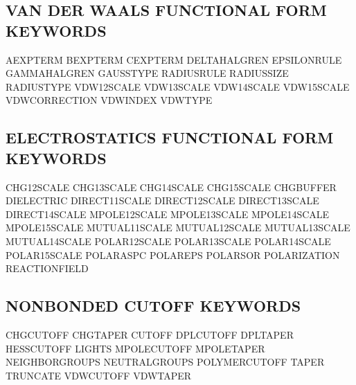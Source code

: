 \documentclass[letterpaper,11pt,english]{sphinxmanual}
\begin{document}
\subsection{VAN DER WAALS FUNCTIONAL FORM KEYWORDS}
\label{\detokenize{text/keywords:van-der-waals-functional-form-keywords}}
A\sphinxhyphen{}EXPTERM       B\sphinxhyphen{}EXPTERM       C\sphinxhyphen{}EXPTERM
DELTA\sphinxhyphen{}HALGREN   EPSILONRULE     GAMMA\sphinxhyphen{}HALGREN
GAUSSTYPE       RADIUSRULE      RADIUSSIZE
RADIUSTYPE      VDW\sphinxhyphen{}12\sphinxhyphen{}SCALE    VDW\sphinxhyphen{}13\sphinxhyphen{}SCALE
VDW\sphinxhyphen{}14\sphinxhyphen{}SCALE    VDW\sphinxhyphen{}15\sphinxhyphen{}SCALE    VDW\sphinxhyphen{}CORRECTION
VDWINDEX        VDWTYPE


\subsection{ELECTROSTATICS FUNCTIONAL FORM KEYWORDS}
\label{\detokenize{text/keywords:electrostatics-functional-form-keywords}}
CHG\sphinxhyphen{}12\sphinxhyphen{}SCALE    CHG\sphinxhyphen{}13\sphinxhyphen{}SCALE    CHG\sphinxhyphen{}14\sphinxhyphen{}SCALE
CHG\sphinxhyphen{}15\sphinxhyphen{}SCALE    CHG\sphinxhyphen{}BUFFER      DIELECTRIC
DIRECT\sphinxhyphen{}11\sphinxhyphen{}SCALE DIRECT\sphinxhyphen{}12\sphinxhyphen{}SCALE DIRECT\sphinxhyphen{}13\sphinxhyphen{}SCALE
DIRECT\sphinxhyphen{}14\sphinxhyphen{}SCALE MPOLE\sphinxhyphen{}12\sphinxhyphen{}SCALE  MPOLE\sphinxhyphen{}13\sphinxhyphen{}SCALE
MPOLE\sphinxhyphen{}14\sphinxhyphen{}SCALE  MPOLE\sphinxhyphen{}15\sphinxhyphen{}SCALE  MUTUAL\sphinxhyphen{}11\sphinxhyphen{}SCALE
MUTUAL\sphinxhyphen{}12\sphinxhyphen{}SCALE MUTUAL\sphinxhyphen{}13\sphinxhyphen{}SCALE MUTUAL\sphinxhyphen{}14\sphinxhyphen{}SCALE
POLAR\sphinxhyphen{}12\sphinxhyphen{}SCALE  POLAR\sphinxhyphen{}13\sphinxhyphen{}SCALE  POLAR\sphinxhyphen{}14\sphinxhyphen{}SCALE
POLAR\sphinxhyphen{}15\sphinxhyphen{}SCALE  POLAR\sphinxhyphen{}ASPC      POLAR\sphinxhyphen{}EPS
POLAR\sphinxhyphen{}SOR       POLARIZATION    REACTIONFIELD


\subsection{NONBONDED CUTOFF KEYWORDS}
\label{\detokenize{text/keywords:nonbonded-cutoff-keywords}}
CHG\sphinxhyphen{}CUTOFF      CHG\sphinxhyphen{}TAPER       CUTOFF
DPL\sphinxhyphen{}CUTOFF      DPL\sphinxhyphen{}TAPER       HESS\sphinxhyphen{}CUTOFF
LIGHTS  MPOLE\sphinxhyphen{}CUTOFF    MPOLE\sphinxhyphen{}TAPER
NEIGHBOR\sphinxhyphen{}GROUPS NEUTRAL\sphinxhyphen{}GROUPS  POLYMER\sphinxhyphen{}CUTOFF
TAPER   TRUNCATE        VDW\sphinxhyphen{}CUTOFF
VDW\sphinxhyphen{}TAPER
\end{document}
